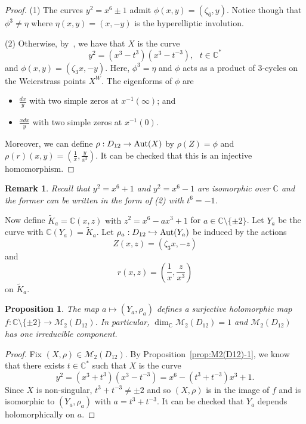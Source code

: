 \documentclass[a4paper,11pt]{amsart}
\numberwithin{equation}{section}
\numberwithin{figure}{section}
\numberwithin{table}{section}
\newtheorem{proposition}[theorem]{Proposition}
\newtheorem{remark}[theorem]{Remark}
\newcommand{\C}{\mathbb{C}}
\DeclareMathOperator{\Aut}{{\rm{Aut}}}
\begin{document}
\begin{proof}
    (1) The curves $y^2 = x^6\pm 1$ admit $\phi(x,y) = (\zeta_6,y)$. Notice though that $\phi^3\neq\eta$ where $\eta(x,y) = (x,-y)$ is the hyperelliptic involution.
    
    (2) Otherwise, by~\cite[Table 2]{Muk}, we have that $X$ is the curve
    \[y^2 = (x^3-t^3)(x^3-t^{-3}),\,\,\,\, t\in\C^{*}\]
    and $\phi(x,y) = (\zeta_{3}x,-y)$. Here, $\phi^3 = \eta$ and $\phi$ acts as a product of 3-cycles on the Weierstrass points $X^{W}$. The eigenforms of $\phi$ are
    \begin{itemize}
        \item $\frac{dx}{y}$ with two simple zeros at $x^{-1}(\infty)$; and
        \item $\frac{xdx}{y}$ with two simple zeros at $x^{-1}(0)$.
    \end{itemize}
    Moreover, we can define $\rho:D_{12}\to\Aut(X)$ by $\rho(Z) = \phi$ and $\rho(r)(x,y) = \left(\frac{1}{x},\frac{y}{x^3}\right)$. It can be checked that this is an injective homomorphism.
\end{proof}

\begin{remark}
    Recall that $y^2 = x^6 + 1$ and $y^2 = x^6-1$ are isomorphic over $\C$ and the former can be written in the form of (2) with $t^6 = -1$.
\end{remark}

Now define $\widetilde{K}_{a} = \C(x,z)\text{ with }z^2 = x^6-ax^3+1$ for $a \in\C\setminus\{\pm 2\}$. Let $Y_{a}$ be the curve with $\C(Y_{a}) = \widetilde{K}_{a}$. Let $\rho_{a}:D_{12}\hookrightarrow\Aut(Y_{a})$ be induced by the actions
\[Z(x,z) = (\zeta_{3}x,-z)\]
and
\[r(x,z) = \left(\frac{1}{x},\frac{z}{x^3}\right)\]
on $\widetilde{K}_{a}$.

\begin{proposition}\label{prop:M2(D12)-2}
    The map $a\mapsto(Y_{a},\rho_{a})$ defines a surjective holomorphic map $f:\C\setminus\{\pm 2\}\to\mathcal{M}_{2}(D_{12})$. In particular, $\dim_{\C}\mathcal{M}_{2}(D_{12}) = 1$ and $\mathcal{M}_{2}(D_{12})$ has one irreducible component.
\end{proposition}

\begin{proof}
    Fix $(X,\rho)\in\mathcal{M}_{2}(D_{12})$. By Proposition~\ref{prop:M2(D12)-1}, we know that there exists $t\in\C^{*}$ such that $X$ is the curve
    \[y^2 = (x^3+t^3)(x^3-t^{-3}) = x^6 - (t^3+t^{-3})x^3+1.\]
    Since $X$ is non-singular, $t^3+t^{-3}\neq\pm 2$ and so $(X,\rho)$ is in the image of $f$ and is isomorphic to $(Y_{a},\rho_{a})$ with $a = t^3+t^{-3}$. It can be checked that $Y_{a}$ depends holomorphically on $a$.
\end{proof}
\end{document}
